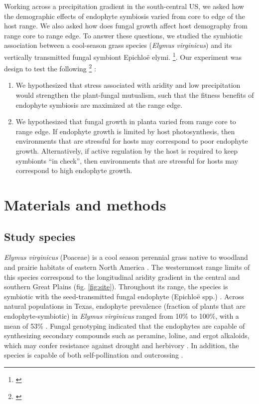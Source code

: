 \documentclass[11pt]{article}
\newcommand{\jacob}[2]{{\color{blue}{#1}}\footnote{\textit{\color{blue}{#2}}}}
\begin{document}
Working across a precipitation gradient in the south-central US, we asked how the demographic effects of endophyte symbiosis varied from core to edge of the host range.
We also asked how does fungal growth affect host demography from range core to range edge. 
To answer these questions, we studied the symbiotic association between a cool-season grass species (\emph{Elymus virginicus}) and its vertically transmitted fungal symbiont Epichloë elymi. \jacob{[Describe ecology and natural history of grass-endophyte interactions]}{I am not sure If we need this}.
Our experiment was design to test the following \jacob{hypotheses}{ I need to update these hypotheses by adding the herbivory effect} :
\begin{enumerate}
\item We hypothesized that stress associated with aridity and low precipitation would strengthen the plant-fungal mutualism, such that the fitness benefits of endophyte symbiosis are maximized at the range edge. 
\item We hypothesized that fungal growth in planta varied from range core to range edge. If endophyte growth is limited by host photosynthesis, then environments that are stressful for hosts may correspond to poor endophyte growth. Alternatively, if active regulation by the host is required to keep symbionts “in check”, then environments that are stressful for hosts may correspond to high endophyte growth.
\end{enumerate}

\section*{Materials and methods}
\subsection*{Study species}
\emph {Elymus virginicus} (Poaceae) is a cool season perennial grass native to woodland and prairie habitats of eastern North America \citep{shaw2011guide}. 
The westernmost range limits of this species correspond to the longitudinal aridity gradient in the central and southern Great Plains (fig. \ref{fig:site}). 
Throughout its range, the species is  symbiotic with the seed-transmitted fungal endophyte (Epichloë spp.) \citep{rudgers2009benefits}. 
Across natural populations in Texas, endophyte prevalence (fraction of plants that are endophyte-symbiotic) in \emph {Elymus virginicus}  ranged from 10\% to 100\%, with a mean of 53\% \citep{sneck2017variation}. 
Fungal genotyping indicated that the endophytes are capable of synthesizing secondary compounds such as peramine, loline, and ergot alkaloids, which may confer resistance against drought and herbivory \citep{beaudry1951seed}.
In addition, the species is capable of both self-pollination and outcrossing \citep{church1958artificial}. 
\end{document}
